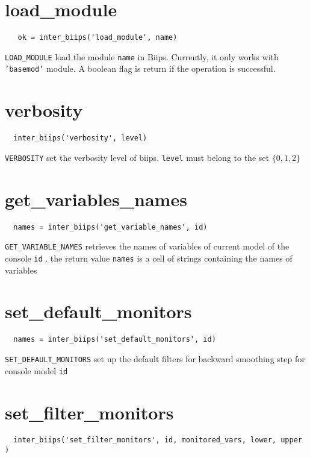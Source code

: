 \documentclass[11pt]{article}
\begin{document}
\section{load\_module}
 
 \begin{lstlisting}
   ok = inter_biips('load_module', name)
 \end{lstlisting}

  \texttt{LOAD\_MODULE} load the module \texttt{name} in Biips. Currently, it only works with \texttt{'basemod'} module. A 
  boolean flag is return if the operation is successful.

\section{verbosity}
 
 \begin{lstlisting}
  inter_biips('verbosity', level) 
 \end{lstlisting}

  \texttt{VERBOSITY} set the verbosity level of biips. \texttt{level} must belong to the set $\{0,1,2\}$

\section{get\_variables\_names}

 \begin{lstlisting}
  names = inter_biips('get_variable_names', id)
 \end{lstlisting}

 \texttt{GET\_VARIABLE\_NAMES} retrieves the names of variables of current model of the console \texttt{id} . the return value \texttt{names}
 is a cell of strings containing the names of variables

\section{set\_default\_monitors}

 \begin{lstlisting}
  names = inter_biips('set_default_monitors', id)
 \end{lstlisting}

 \texttt{SET\_DEFAULT\_MONITORS} set up the default filters for backward smoothing step for console model \texttt{id}

\section{set\_filter\_monitors}
 \begin{lstlisting}
  inter_biips('set_filter_monitors', id, monitored_vars, lower, upper )
 \end{lstlisting}
   
\end{document}

